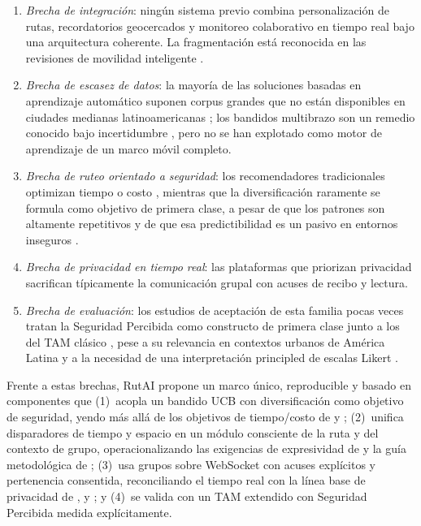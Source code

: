 \documentclass[a4paper,fleqn]{cas-sc}
\newcommand{\RUTAI}{RutAI\xspace}
\newcommand{\UCB}{UCB\xspace}
\newcommand{\TAM}{TAM\xspace}
\begin{document}
	\begin{enumerate}
		\item \emph{Brecha de integraci\'on}: ning\'un sistema previo combina personalizaci\'on de rutas, recordatorios geocercados y monitoreo colaborativo en tiempo real bajo una arquitectura coherente. La fragmentaci\'on est\'a reconocida en las revisiones de movilidad inteligente \citep{paiva2021smartmobility,kung2023lbs}.
		\item \emph{Brecha de escasez de datos}: la mayor\'ia de las soluciones basadas en aprendizaje autom\'atico suponen corpus grandes que no est\'an disponibles en ciudades medianas latinoamericanas \citep{yuan2022mlits,liu2022multimodal,zhang2025drlnavigation}; los bandidos multibrazo son un remedio conocido bajo incertidumbre \citep{bouneffouf2020mabsurvey,auer2002ucb,zeng2016mab,shi2021fedmab}, pero no se han explotado como motor de aprendizaje de un marco m\'ovil completo.
		\item \emph{Brecha de ruteo orientado a seguridad}: los recomendadores tradicionales optimizan tiempo o costo \citep{campigotto2017favour,guo2021online,liu2022multimodal,zhang2025drlnavigation}, mientras que la diversificaci\'on raramente se formula como objetivo de primera clase, a pesar de que los patrones son altamente repetitivos \citep{song2010predictability,cagney2025urban,liu2022route} y de que esa predictibilidad es un pasivo en entornos inseguros \citep{tapia2024inseguridad,maloney2025worldbank,inegi2024ensu}.
		\item \emph{Brecha de privacidad en tiempo real}: las plataformas que priorizan privacidad \citep{li2017locsharing,mckenzie2022privyto,shokri2014mobicrowd} sacrifican t\'ipicamente la comunicaci\'on grupal con acuses de recibo y lectura.
		\item \emph{Brecha de evaluaci\'on}: los estudios de aceptaci\'on de esta familia pocas veces tratan la Seguridad Percibida como constructo de primera clase junto a los del \TAM cl\'asico \citep{davis1989tam}, pese a su relevancia en contextos urbanos de Am\'erica Latina \citep{tapia2024inseguridad,maloney2025worldbank,inegi2024ensu} y a la necesidad de una interpretaci\'on principled de escalas Likert \citep{lindner2024likert}.
	\end{enumerate}
	
	Frente a estas brechas, \RUTAI propone un marco \'unico, reproducible y basado en componentes que (1)~acopla un bandido \UCB con diversificaci\'on como objetivo de seguridad, yendo m\'as all\'a de los objetivos de tiempo/costo de \citet{campigotto2017favour} y \citet{guo2021online}; (2)~unifica disparadores de tiempo y espacio en un m\'odulo consciente de la ruta y del contexto de grupo, operacionalizando las exigencias de expresividad de \citet{wang2015beyond} y la gu\'ia metodol\'ogica de \citet{shevchenko2024geofencing}; (3)~usa grupos sobre WebSocket con acuses expl\'icitos y pertenencia consentida, reconciliando el tiempo real con la l\'inea base de privacidad de \citet{li2017locsharing}, \citet{mckenzie2022privyto} y \citet{shokri2014mobicrowd}; y (4)~se valida con un \TAM extendido \citep{davis1989tam} con Seguridad Percibida medida expl\'icitamente.
	
\end{document}
